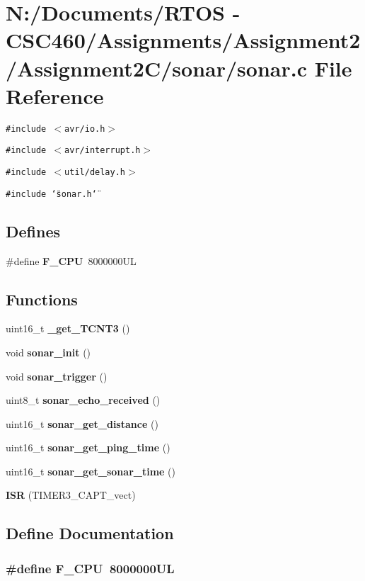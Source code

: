 \section{N:/Documents/RTOS - CSC460/Assignments/Assignment2/Assignment2C/sonar/sonar.c File Reference}
\label{sonar_8c}
{\tt \#include $<$avr/io.h$>$}\par
{\tt \#include $<$avr/interrupt.h$>$}\par
{\tt \#include $<$util/delay.h$>$}\par
{\tt \#include \char`\"{}sonar.h\char`\"{}}\par
\subsection*{Defines}
\begin{CompactItemize}
\item 
\#define {\bf F\_\-CPU}~8000000UL
\end{CompactItemize}
\subsection*{Functions}
\begin{CompactItemize}
\item 
uint16\_\-t {\bf \_\-get\_\-TCNT3} ()
\item 
void {\bf sonar\_\-init} ()
\item 
void {\bf sonar\_\-trigger} ()
\item 
uint8\_\-t {\bf sonar\_\-echo\_\-received} ()
\item 
uint16\_\-t {\bf sonar\_\-get\_\-distance} ()
\item 
uint16\_\-t {\bf sonar\_\-get\_\-ping\_\-time} ()
\item 
uint16\_\-t {\bf sonar\_\-get\_\-sonar\_\-time} ()
\item 
{\bf ISR} (TIMER3\_\-CAPT\_\-vect)
\end{CompactItemize}


\subsection{Define Documentation}
\subsubsection{\setlength{\rightskip}{0pt plus 5cm}\#define F\_\-CPU~8000000UL}\label{sonar_8c_43bafb28b29491ec7f871319b5a3b2f8}




